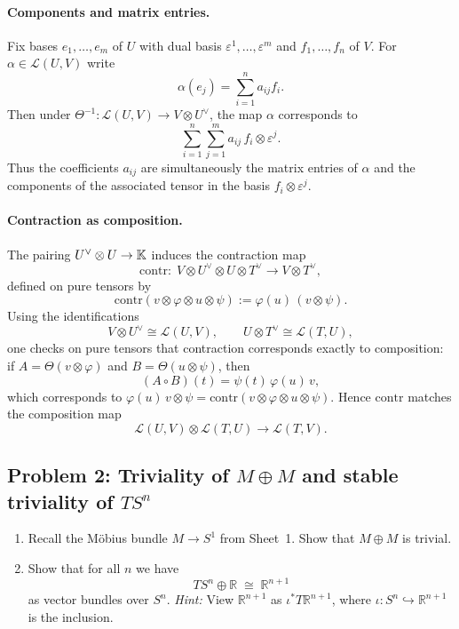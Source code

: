 \documentclass[12pt,a4paper]{article}
\theoremstyle{plain}
\theoremstyle{definition}      %
\begin{document}
	\paragraph{\textbf{Components and matrix entries.}}
	Fix bases $e_1,\dots,e_m$ of $U$ with dual basis $\varepsilon^1,\dots,\varepsilon^m$ and
	$f_1,\dots,f_n$ of $V$. For $\alpha\in\mathcal L(U,V)$ write
	\[
	\alpha(e_j)=\sum_{i=1}^n a_{ij} f_i.
	\]
	Then under $\Theta^{-1}:\mathcal L(U,V)\to V\otimes U^\vee$, the map $\alpha$ corresponds to
	\[
	\sum_{i=1}^n\sum_{j=1}^m a_{ij}\, f_i\otimes \varepsilon^j.
	\]
	Thus the coefficients $a_{ij}$ are simultaneously the matrix entries of $\alpha$ and the components
	of the associated tensor in the basis $f_i\otimes \varepsilon^j$.
	
	\paragraph{\textbf{Contraction as composition.}}
	The pairing $U^\vee\otimes U\to \Bbb K$ induces the contraction map
	\[
	\mathrm{contr}:\; V\otimes U^\vee\otimes U\otimes T^\vee \longrightarrow V\otimes T^\vee,
	\]
	defined on pure tensors by
	\[
	\mathrm{contr}(v\otimes \varphi \otimes u\otimes \psi)
	:= \varphi(u)\,(v\otimes \psi).
	\]
	Using the identifications
	\[
	V\otimes U^\vee \cong \mathcal L(U,V),
	\qquad
	U\otimes T^\vee \cong \mathcal L(T,U),
	\]
	one checks on pure tensors that contraction corresponds exactly to composition:
	if $A=\Theta(v\otimes\varphi)$ and $B=\Theta(u\otimes\psi)$, then
	\[
	(A\circ B)(t) = \psi(t)\,\varphi(u)\,v,
	\]
	which corresponds to $\varphi(u)\,v\otimes \psi = \mathrm{contr}(v\otimes\varphi\otimes u\otimes\psi)$.
	Hence $\mathrm{contr}$ matches the composition map
	\[
	\mathcal L(U,V)\otimes \mathcal L(T,U)\longrightarrow \mathcal L(T,V).
	\]
	
	
	\subsection*{Problem 2: Triviality of $M\oplus M$ and stable triviality of $TS^n$}
	
	\begin{enumerate}
		\item[(a)] Recall the Möbius bundle $M\to S^1$ from Sheet~1. Show that $M\oplus M$ is trivial.
		\item[(b)] Show that for all $n$ we have
		\[
		TS^n \oplus \mathbb{R} \;\cong\; \mathbb{R}^{n+1}
		\]
		as vector bundles over $S^n$.
		\emph{Hint:} View $\mathbb{R}^{n+1}$ as $\iota^*T\mathbb{R}^{n+1}$, where $\iota:S^n\hookrightarrow \mathbb{R}^{n+1}$
		is the inclusion.
	\end{enumerate}
	
\end{document}
